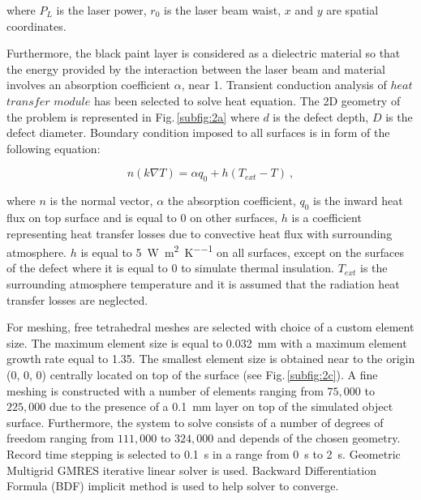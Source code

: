 \noindent where $P_L$ is the laser power, $r_0$ is the laser beam waist, $x$ and $y$ are spatial coordinates.
%

Furthermore, the black paint layer is considered as a dielectric material so that the energy provided by the interaction between the laser beam and material involves an absorption coefficient $\alpha$, near 1.
Transient conduction analysis of $heat$ $transfer$ $module$ has been selected to solve heat equation. The 2D geometry of the problem is represented in Fig.\,\ref{subfig:2a} where $d$ is the defect depth, $D$ is the defect diameter. Boundary condition imposed to all surfaces is in form of the following equation:

\begin{equation}
  \label{eq:33}
  n(k \nabla T) = \alpha q_0 + h(T_{ext} - T) \ ,
\end{equation}

\noindent where $n$ is the normal vector, $\alpha$ the absorption coefficient, $q_0$ is the inward heat flux on top surface and is equal to 0 on other surfaces, $h$ is a coefficient representing heat transfer losses due to convective heat flux with surrounding atmosphere. $h$ is equal to \SI{5}{\watt \per \square \metre \per \kelvin} on all surfaces, except on the surfaces of the defect where it is equal to 0 to simulate thermal insulation. $T_{ext}$ is the surrounding atmosphere temperature and it is assumed that the radiation heat transfer losses are neglected. 

For meshing, free tetrahedral meshes are selected with choice of a custom element size. The maximum element size is equal to \SI{0.032}{\milli \metre} with a maximum element growth rate equal to 1.35. The smallest element size is obtained near to the origin (0, 0, 0) centrally located on top of the surface (see Fig.\,\ref{subfig:2c}). A fine meshing is constructed with a number of elements ranging from $75,000$ to $225,000$ due to the presence of a \SI{0.1}{\milli \metre} layer on top of the simulated object surface. Furthermore, the system to solve consists of a number of degrees of freedom ranging from $111,000$ to $324,000$ and depends of the chosen geometry. Record time stepping is selected to \SI{0.1}{\second} in a range from \SI{0}{\second} to \SI{2}{\second}. Geometric Multigrid GMRES iterative linear solver is used. Backward Differentiation Formula (BDF) implicit method is used to help solver to converge.

  
